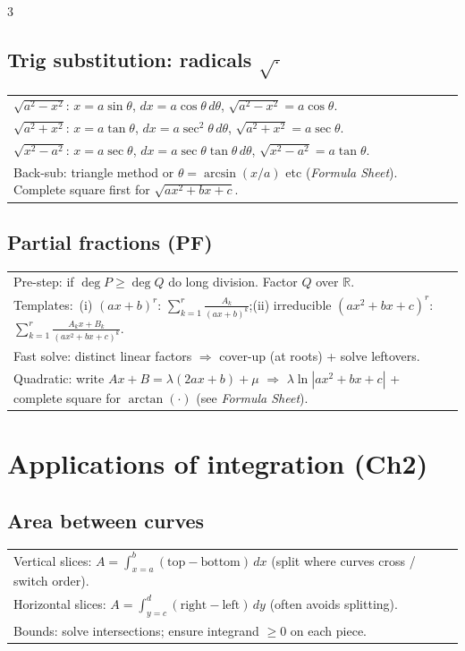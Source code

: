 \documentclass[10pt]{article}
\newcommand{\R}{\mathbb{R}}
\newcommand{\FS}{\textit{Formula Sheet}}
\newcommand{\dx}{\,dx}
\newcommand{\dy}{\,dy}
\begin{document}
\begin{multicols}{3}
\subsection*{Trig substitution: radicals $\sqrt{\cdot}$}
\vspace{-1pt}
\begin{tabular}{@{}p{}@{}}
$\sqrt{a^2-x^2}$: $x=a\sin\theta$, $dx=a\cos\theta\,d\theta$, $\sqrt{a^2-x^2}=a\cos\theta$.\\
$\sqrt{a^2+x^2}$: $x=a\tan\theta$, $dx=a\sec^2\theta\,d\theta$, $\sqrt{a^2+x^2}=a\sec\theta$.\\
$\sqrt{x^2-a^2}$: $x=a\sec\theta$, $dx=a\sec\theta\tan\theta\,d\theta$, $\sqrt{x^2-a^2}=a\tan\theta$.\\
Back-sub: triangle method or $\theta=\arcsin(x/a)$ etc (\FS). Complete square first for $\sqrt{ax^2+bx+c}$.\\
\end{tabular}

\subsection*{Partial fractions (PF)}
\vspace{-1pt}
\begin{tabular}{@{}p{}@{}}
Pre-step: if $\deg P\ge\deg Q$ do long division. Factor $Q$ over $\R$.\\
Templates:\ (i) $(ax+b)^r$: $\sum_{k=1}^r \frac{A_k}{(ax+b)^k}$;\quad (ii) irreducible $(ax^2+bx+c)^r$: $\sum_{k=1}^r \frac{A_k x+B_k}{(ax^2+bx+c)^k}$.\\
Fast solve: distinct linear factors $\Rightarrow$ cover-up (at roots) + solve leftovers.\\
Quadratic: write $Ax+B=\lambda(2ax+b)+\mu$ $\Rightarrow$ $\lambda\ln|ax^2+bx+c|$ + complete square for $\arctan(\cdot)$ (see \FS).\\
\end{tabular}

\section*{Applications of integration (Ch2)}
\subsection*{Area between curves}
\vspace{-1pt}
\begin{tabular}{@{}p{}@{}}
Vertical slices: $A=\int_{x=a}^{b}(\text{top}-\text{bottom})\dx$ (split where curves cross / switch order).\\
Horizontal slices: $A=\int_{y=c}^{d}(\text{right}-\text{left})\dy$ (often avoids splitting).\\
Bounds: solve intersections; ensure integrand $\ge 0$ on each piece.\\
\end{tabular}


\end{multicols}
\end{document}
